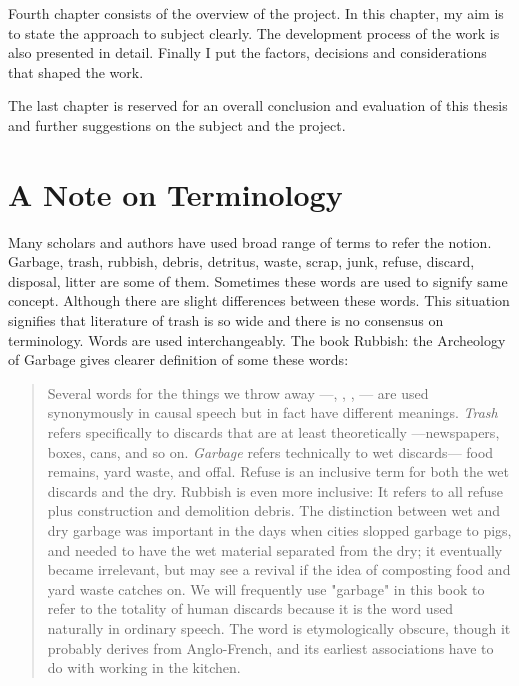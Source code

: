 Fourth chapter consists of the overview of the project. In this chapter, my aim is to state the approach to subject clearly. The development process of the work is also presented in detail. Finally I put the factors, decisions and considerations that shaped the work.

The last chapter is reserved for an overall conclusion and evaluation of this thesis and further suggestions on the subject and the project.



\section{A Note on Terminology}
Many scholars and authors have used broad range of terms to refer the notion. Garbage, trash, rubbish, debris, detritus, waste, scrap, junk, refuse, discard, disposal, litter are some of them. Sometimes these words are used to signify same concept. Although there are slight differences between these words. This situation signifies that literature of trash is so wide and there is no consensus on terminology. Words are used interchangeably. The book Rubbish: the Archeology of Garbage gives clearer definition of some these words:

\begin{quote}
Several words for the things we throw away ---, , , --- are used synonymously in causal speech but in fact have different meanings. \textit{Trash} refers specifically to discards that are at least theoretically  ---newspapers, boxes, cans, and so on. \textit{Garbage} refers technically to wet discards--- food remains, yard waste, and offal. Refuse is an inclusive term for both the wet discards and the dry. Rubbish is even more inclusive: It refers to all refuse plus construction and demolition debris. The distinction between wet and dry garbage was important in the days when cities slopped garbage to pigs, and needed to have the wet material separated from the dry; it eventually became irrelevant, but may see a revival if the idea of composting food and yard waste catches on. We will frequently use "garbage" in this book to refer to the totality of human discards because it is the word used naturally in ordinary speech. The word is etymologically obscure, though it probably derives from Anglo-French, and its earliest associations have to do with working in the kitchen. \citep[9]{rathje1992rubbish}
\end{quote}

